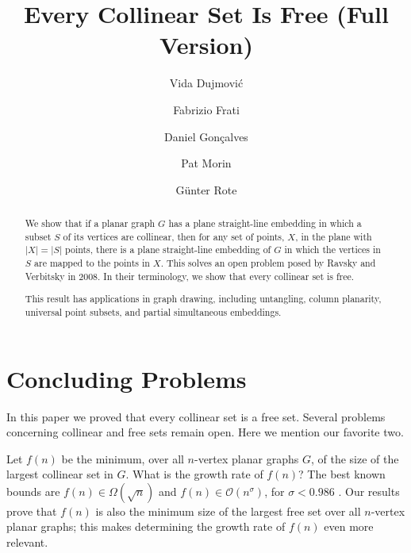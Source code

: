 \documentclass[a4paper, 11pt]{llncs}
\begin{document}
\title{Every Collinear Set Is Free (Full Version)}
\author{Vida Dujmovi\'c\and Fabrizio Frati  \and Daniel Gon\c{c}alves  \and Pat Morin  \and G\"unter Rote}
\maketitle

\linenumbers

\begin{abstract}
  We show that if a planar graph $G$ has a plane straight-line embedding
  in which a subset $S$ of its vertices are collinear, then for any
  set of points, $X$, in the plane with $|X|=|S|$ points, there is a plane straight-line
  embedding of $G$ in which the vertices in $S$ are mapped to the points
  in $X$.  This solves an open problem posed by Ravsky and Verbitsky in
  2008.  In their terminology, we show that every collinear set is free.
  
  This result has applications in graph drawing, including untangling,
  column planarity, universal point subsets, and partial simultaneous
  embeddings.
\end{abstract}

\newpage
{}
\pagestyle{plain}






\section{Concluding Problems}

In this paper we proved that every collinear set is a free set. Several problems concerning collinear and free sets remain open. Here we mention our favorite two.

Let $f(n)$ be the minimum, over all $n$-vertex planar graphs $G$, of the size of the largest collinear set in $G$. What is the growth rate of $f(n)$? The best known bounds are $f(n)\in\Omega(\sqrt{n})$ and $f(n)\in \mathcal{O}(n^\sigma)$, for $\sigma < 0.986$ \cite{bose.dujmovic.ea:polynomial,ravsky.verbitsky:on}. Our results prove that $f(n)$ is also the minimum size of the largest free set over all $n$-vertex planar graphs; this makes determining the growth rate of $f(n)$ even more relevant.
%
\end{document}

